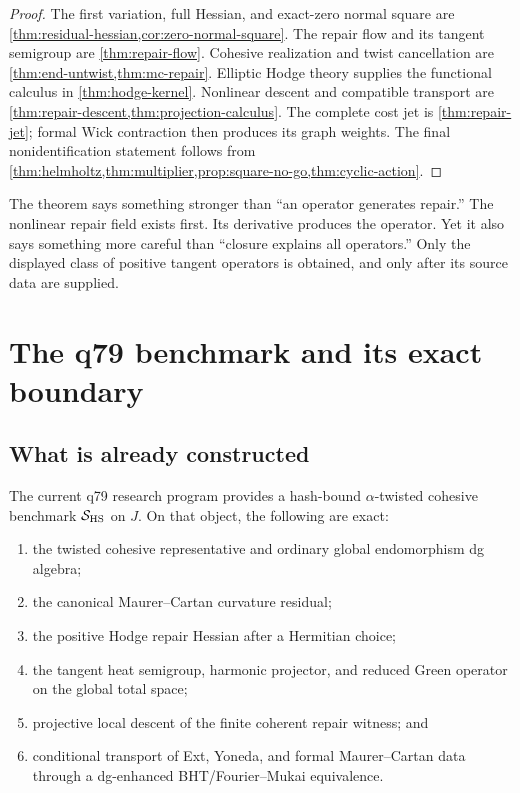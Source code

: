 \documentclass[11pt,a4paper]{article}
\newcommand{\HS}{\mathrm{HS}}
\begin{document}
\begin{proof}
The first variation, full Hessian, and exact-zero normal square are
\cref{thm:residual-hessian,cor:zero-normal-square}.  The repair flow and its
tangent semigroup are \cref{thm:repair-flow}.  Cohesive realization and
twist cancellation are \cref{thm:end-untwist,thm:mc-repair}.  Elliptic Hodge
theory supplies the functional calculus in \cref{thm:hodge-kernel}.
Nonlinear descent and compatible transport are
\cref{thm:repair-descent,thm:projection-calculus}.  The complete cost jet is
\cref{thm:repair-jet}; formal Wick contraction then produces its graph
weights.  The final nonidentification statement follows from
\cref{thm:helmholtz,thm:multiplier,prop:square-no-go,thm:cyclic-action}.
\end{proof}

The theorem says something stronger than ``an operator generates repair.''
The nonlinear repair field exists first.  Its derivative produces the
operator.  Yet it also says something more careful than ``closure explains
all operators.''  Only the displayed class of positive tangent operators is
obtained, and only after its source data are supplied.

\section{The q79 benchmark and its exact boundary}
\label{sec:q79}

\subsection{What is already constructed}

The current q79 research program provides a hash-bound
\(\alpha\)-twisted cohesive benchmark \(\calS_{\HS}\) on \(J\).  On that
object, the following are exact:
\begin{enumerate}
\item the twisted cohesive representative and ordinary global endomorphism
dg algebra;
\item the canonical Maurer--Cartan curvature residual;
\item the positive Hodge repair Hessian after a Hermitian choice;
\item the tangent heat semigroup, harmonic projector, and reduced Green
operator on the global total space;
\item projective local descent of the finite coherent repair witness; and
\item conditional transport of Ext, Yoneda, and formal Maurer--Cartan data
through a dg-enhanced BHT/Fourier--Mukai equivalence.
\end{enumerate}
\end{document}
